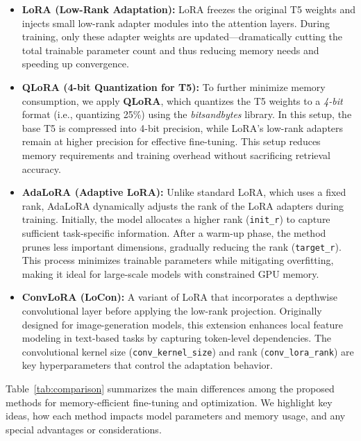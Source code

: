 \begin{itemize}
    \item \textbf{LoRA (Low-Rank Adaptation):} LoRA freezes the original T5 weights and injects small low-rank adapter modules into the attention layers. During training, only these adapter weights are updated—dramatically cutting the total trainable parameter count and thus reducing memory needs and speeding up convergence.

    \item \textbf{QLoRA (4-bit Quantization for T5):} To further minimize memory consumption, we apply \textbf{QLoRA}, which quantizes the T5 weights to a \emph{4-bit} format (i.e., quantizing 25\%) using the \textit{bitsandbytes} library. In this setup, the base T5 is compressed into 4-bit precision, while LoRA’s low-rank adapters remain at higher precision for effective fine-tuning. This setup reduces memory requirements and training overhead without sacrificing retrieval accuracy.

    \item \textbf{AdaLoRA (Adaptive LoRA):} Unlike standard LoRA, which uses a fixed rank, AdaLoRA dynamically adjusts the rank of the LoRA adapters during training. Initially, the model allocates a higher rank (\texttt{init\_r}) to capture sufficient task-specific information. After a warm-up phase, the method prunes less important dimensions, gradually reducing the rank (\texttt{target\_r}). This process minimizes trainable parameters while mitigating overfitting, making it ideal for large-scale models with constrained GPU memory.

    \item \textbf{ConvLoRA (LoCon):} A variant of LoRA that incorporates a depthwise convolutional layer before applying the low-rank projection. Originally designed for image-generation models, this extension enhances local feature modeling in text-based tasks by capturing token-level dependencies. The convolutional kernel size (\texttt{conv\_kernel\_size}) and rank (\texttt{conv\_lora\_rank}) are key hyperparameters that control the adaptation behavior.
\end{itemize}

Table~\ref{tab:comparison} summarizes the main differences among the proposed methods for memory-efficient fine-tuning and optimization. We highlight key ideas, how each method impacts model parameters and memory usage, and any special advantages or considerations.


